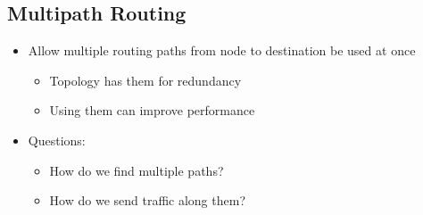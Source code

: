 \documentclass[12pt]{ctexart}   %
\begin{document}
	\subsection{Multipath Routing}
	\begin{itemize}
		\item Allow multiple routing paths from node to destination be used at once
		\begin{itemize}
			\item Topology has them for redundancy
			\item Using them can improve performance
		\end{itemize}
		
		\item Questions:
		\begin{itemize}
			\item How do we find multiple paths?
			\item How do we send traffic along them?
		\end{itemize}
	\end{itemize}
	
\end{document}
